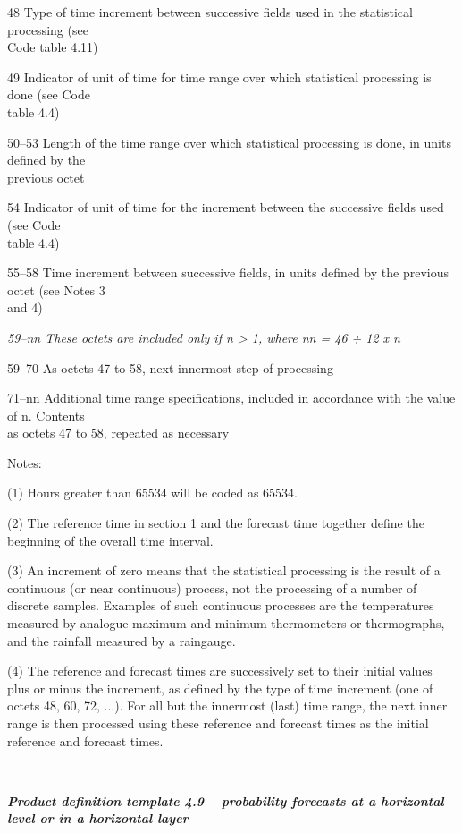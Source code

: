 48 Type of time increment between successive fields used in the statistical processing (see\\
Code table 4.11)

49 Indicator of unit of time for time range over which statistical processing is done (see Code\\
table 4.4)

50--53 Length of the time range over which statistical processing is done, in units defined by the\\
previous octet

54 Indicator of unit of time for the increment between the successive fields used (see Code\\
table 4.4)

55--58 Time increment between successive fields, in units defined by the previous octet (see Notes 3\\
and 4)

\emph{59--nn These octets are included only if n \textgreater{} 1, where nn = 46 + 12 x n}

59--70 As octets 47 to 58, next innermost step of processing

71--nn Additional time range specifications, included in accordance with the value of n. Contents\\
as octets 47 to 58, repeated as necessary

Notes:

(1) Hours greater than 65534 will be coded as 65534.

(2) The reference time in section 1 and the forecast time together define the beginning of the overall time interval.

(3) An increment of zero means that the statistical processing is the result of a continuous (or near continuous) process, not the processing of a number of discrete samples. Examples of such continuous processes are the temperatures measured by analogue maximum and minimum thermometers or thermographs, and the rainfall measured by a raingauge.

(4) The reference and forecast times are successively set to their initial values plus or minus the increment, as defined by the type of time increment (one of octets 48, 60, 72, ...). For all but the innermost (last) time range, the next inner range is then processed using these reference and forecast times as the initial reference and forecast times.

\emph{\textbf{\\
}}

\emph{\textbf{Product definition template 4.9 -- probability forecasts at a horizontal level or in a horizontal layer}}

